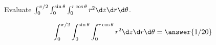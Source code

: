 \documentclass{ximera}
\author{David Guichard \and Neal Koblitz \and H. Jerome Keisler \and Albert Scheller \and Barry Balof \and Mike Wills \and Matthew Carr}
\begin{document}
\begin{exercise}





Evaluate  $\int_{0}^{\pi/2}\int_{0}^{\sin\theta}\int_{0}^{r\cos\theta}r^2 \d z\d r\d \theta$.

\begin{prompt}
\[
\int_{0}^{\pi/2}\int_{0}^{\sin\theta}\int_{0}^{r\cos\theta}r^2 \d z\d r\d \theta=\answer{1/20}
\]
\end{prompt}



\end{exercise}
\end{document}
